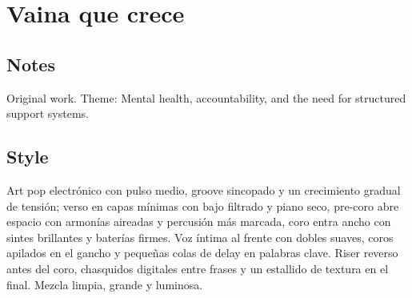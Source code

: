 \section{Vaina que crece}

\subsection{Notes}
Original work.
Theme: Mental health, accountability, and the need for structured support systems.

\subsection{Style}
Art pop electrónico con pulso medio, groove sincopado y un crecimiento gradual de tensión; verso en capas mínimas con bajo filtrado y piano seco, pre-coro abre espacio con armonías aireadas y percusión más marcada, coro entra ancho con sintes brillantes y baterías firmes. Voz íntima al frente con dobles suaves, coros apilados en el gancho y pequeñas colas de delay en palabras clave. Riser reverso antes del coro, chasquidos digitales entre frases y un estallido de textura en el final. Mezcla limpia, grande y luminosa.

